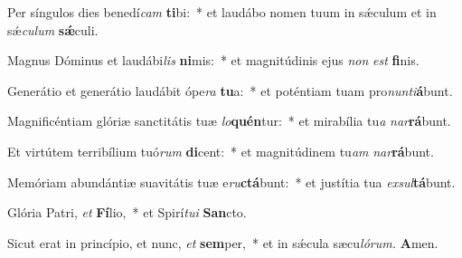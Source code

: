 \item Per síngulos dies benedí\textit{cam} \textbf{ti}bi:~* et laudábo nomen tuum in sǽculum et in sǽ\hspace*{0.02em}\textit{culum} \textbf{sǽ}culi.
\item Magnus Dóminus et laudábi\textit{lis} \textbf{ni}mis:~* et magnitúdinis ejus \textit{non} \textit{est} \textbf{fi}nis.
\item Generátio et generátio laudábit ópe\textit{ra} \textbf{tu}a:~* et poténtiam tuam pro\textit{nunti}\textbf{á}bunt.
\item Magnificéntiam glóriæ sanctitátis tuæ \textit{lo}\textbf{quén}tur:~* et mirabília tu\hspace*{0.02em}\textit{a} \textit{nar}\textbf{rá}bunt.
\item Et virtútem terribílium tuó\textit{rum} \textbf{di}cent:~* et magnitúdinem tu\hspace*{0.02em}\textit{am} \textit{nar}\textbf{rá}bunt.
\item Memóriam abundántiæ suavitátis tuæ e\textit{ru}\textbf{ctá}bunt:~* et justítia tua \textit{exsul}\textbf{tá}bunt.
\item Glória Patri, \textit{et} \textbf{Fí}lio,~* et Spirí\hspace{0.03em}\textit{tui} \textbf{San}cto.
\item Sicut erat in princípio, et nunc, \textit{et} \textbf{sem}per,~* et in sǽcula sæcu\hspace{0.03em}\textit{lórum.} \textbf{A}men.